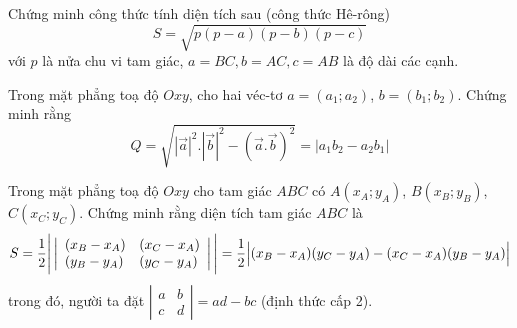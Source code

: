 \begin{vd}%
	Chứng minh công thức tính diện tích sau (công thức Hê-rông)
	$$S=\sqrt{p(p-a)(p-b)(p-c)}$$
	với $p$ là nửa chu vi tam giác, $a=BC, b=AC, c=AB$ là độ dài các cạnh.
\end{vd}

\begin{vd}%
	Trong mặt phẳng toạ độ $Oxy$, cho hai véc-tơ $a=(a_1;a_2)$, $b=(b_1;b_2)$. Chứng minh rằng
	$$Q=\sqrt{|\vec{a}|^2.|\vec{b}|^2-(\vec{a}.\vec{b})^2}=|a_1b_2-a_2b_1|$$
\end{vd}

\begin{vd}%
	Trong mặt phẳng toạ độ $Oxy$ cho tam giác $ABC$ có $A(x_A;y_A)$, $B(x_B;y_B)$, $C(x_C;y_C)$. Chứng minh rằng diện tích tam giác $ABC$ là
	$$S=\dfrac{1}{2}\Bigg|\left|
	\begin{array}{l l}
	(x_B-x_A) & (x_C-x_A) \\
	(y_B-y_A) & (y_C-y_A)
	\end{array}
	\right|\Bigg|=\dfrac{1}{2}
	\Big|(x_B-x_A)(y_C-y_A)-(x_C-x_A)(y_B-y_A)\Big|
	$$
	trong đó, người ta đặt $\left|\begin{array}{ll}a&b\\c&d\end{array}\right|=ad-bc$ (định thức cấp 2).
\end{vd}

